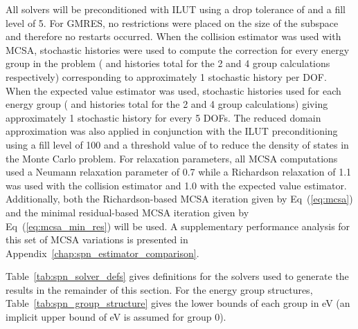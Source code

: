 All solvers will be preconditioned with ILUT using a drop tolerance of
 and a fill level of 5. For GMRES, no restrictions were
placed on the size of the subspace and therefore no restarts
occurred. When the collision estimator was used with MCSA, 
stochastic histories were used to compute the correction for every
energy group in the problem ( and  histories total
for the 2 and 4 group calculations respectively) corresponding to
approximately 1 stochastic history per DOF. When the expected value
estimator was used,  stochastic histories used for each
energy group ( and  histories total for the 2 and
4 group calculations) giving approximately 1 stochastic history for
every 5 DOFs. The reduced domain approximation was also applied in
conjunction with the ILUT preconditioning using a fill level of 100
and a threshold value of  to reduce the density of states
in the Monte Carlo problem. For relaxation parameters, all MCSA
computations used a Neumann relaxation parameter of 0.7 while a
Richardson relaxation of 1.1 was used with the collision estimator and
1.0 with the expected value estimator. Additionally, both the
Richardson-based MCSA iteration given by Eq~(\ref{eq:mcsa}) and the
minimal residual-based MCSA iteration given by
Eq~(\ref{eq:mcsa_min_res}) will be used. A supplementary performance
analysis for this set of MCSA variations is presented in
Appendix~\ref{chap:spn_estimator_comparison}.

Table~\ref{tab:spn_solver_defs} gives definitions for the
solvers used to generate the results in the remainder of this
section. For the energy group structures,
Table~\ref{tab:spn_group_structure} gives the lower bounds of each
group in eV (an implicit upper bound of  eV is assumed for
group 0).

